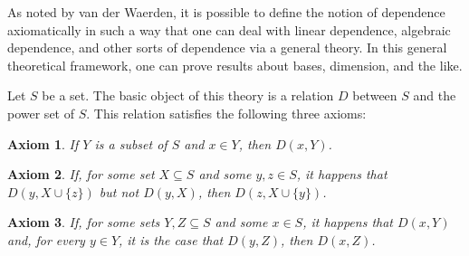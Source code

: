\documentclass[12pt]{article}
\newtheorem{axiom}{Axiom}
\begin{document}
As noted by van der Waerden, it is possible to define the notion of dependence axiomatically in such a way that one can deal with linear dependence, algebraic dependence, and other sorts of dependence via a general theory.  In this general theoretical framework, one can prove results about bases, dimension, and the like.

Let $S$ be a set.  The basic object of this theory is a relation $D$ between $S$ and the power set of $S$.  This relation satisfies the following three axioms:

\begin{axiom} 
If $Y$ is a subset of $S$ and $x \in Y$, then $D(x,Y)$.
\end{axiom}

\begin{axiom}
If, for some set $X \subseteq S$ and some $y,z \in S$, it happens that $D(y,X \cup \{z\})$ but not $D(y,X)$, then $D(z, X \cup \{y\})$.
\end{axiom}

\begin{axiom}
If,  for some sets $Y,Z \subseteq S$ and some $x \in S$, it happens that $D(x,Y)$ and, for every $y \in Y$, it is the case that $D(y,Z)$, then $D(x,Z)$.
\end{axiom}
\end{document}
